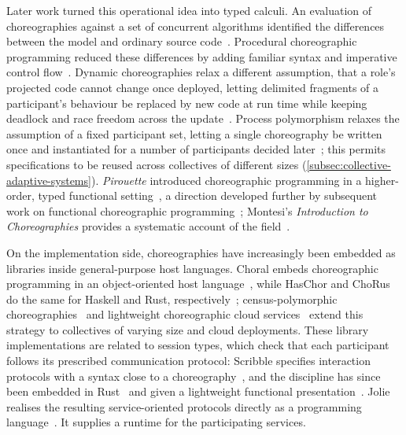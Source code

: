 Later work turned this operational idea into typed calculi.
%
An evaluation of choreographies against a set of concurrent algorithms identified the differences between the model and ordinary source code~\cite{CruzFilipe:2016}.
Procedural choreographic programming reduced these differences by adding familiar syntax and imperative control flow~\cite{CruzFilipe2017}.
%
Dynamic choreographies relax a different assumption, that a role's projected code cannot change once deployed,
letting delimited fragments of a participant's behaviour be replaced by new code at run time while keeping deadlock and race freedom across the update~\cite{Preda:2017}.
%
Process polymorphism relaxes the assumption of a fixed participant set,
letting a single choreography be written once and instantiated for a number of participants decided later~\cite{GRAVERSEN_HIRSCH_MONTESI_2024};
this permits specifications to be reused across collectives of different sizes (\cref{subsec:collective-adaptive-systems}).
%
\emph{Pirouette} introduced choreographic programming in a higher-order, typed functional setting~\cite{10.1145/3498684},
a direction developed further by subsequent work on functional choreographic programming~\cite{10.1007/978-3-031-17715-6_15};
Montesi's \emph{Introduction to Choreographies} provides a systematic account of the field~\cite{Montesi2023chor}.

On the implementation side, choreographies have increasingly been embedded as libraries inside general-purpose host languages.
%
Choral embeds choreographic programming in an object-oriented host language~\cite{10.1145/3632398},
while HasChor and ChoRus do the same for Haskell and Rust, respectively~\cite{10.1145/3607849,kashiwa2024chorus};
census-polymorphic choreographies~\cite{DBLP:journals/pacmpl/BatesKJSKN25} and lightweight choreographic cloud services~\cite{DBLP:conf/pepm/IonescuR26} extend this strategy to collectives of varying size and cloud deployments.
%
These library implementations are related to session types,
which check that each participant follows its prescribed communication protocol:
Scribble specifies interaction protocols with a syntax close to a choreography~\cite{DBLP:conf/icdcit/HondaMBCY11},
and the discipline has since been embedded in Rust~\cite{chen_et_al:LIPIcs.ECOOP.2022.22} and given a lightweight functional presentation~\cite{Lindley:2017}.
%
Jolie realises the resulting service-oriented protocols directly as a programming language~\cite{DBLP:books/sp/wsf14/MontesiGZ14}.
It supplies a runtime for the participating services.

